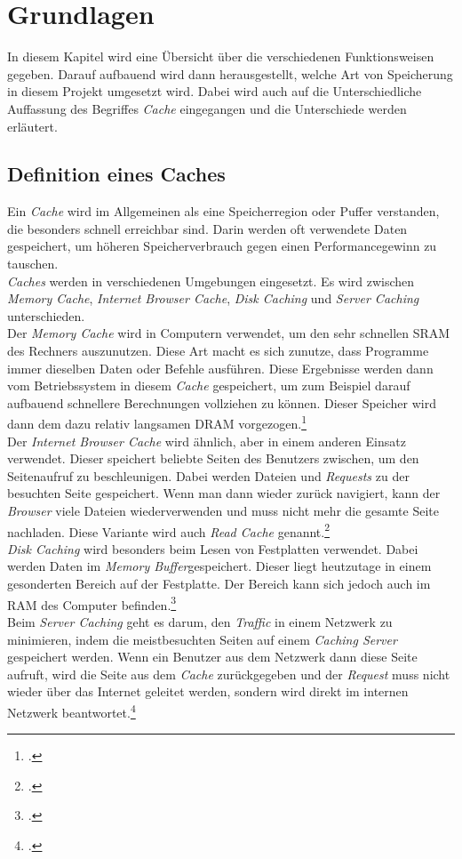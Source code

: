 \chapter{Grundlagen}
\label{cha:grundlagen}
In diesem Kapitel wird eine Übersicht über die verschiedenen Funktionsweisen gegeben. Darauf aufbauend wird dann herausgestellt, welche Art von Speicherung in diesem Projekt umgesetzt wird. Dabei wird auch auf die Unterschiedliche Auffassung des Begriffes \textit{Cache} eingegangen und die Unterschiede werden erläutert.

\section{Definition eines Caches}
\label{sec:cache-definition}
Ein \textit{Cache} wird im Allgemeinen als eine Speicherregion oder Puffer verstanden, die besonders schnell erreichbar sind. Darin werden oft verwendete Daten gespeichert, um höheren Speicherverbrauch gegen einen Performancegewinn zu tauschen.\\
\textit{Caches} werden in verschiedenen Umgebungen eingesetzt. Es wird zwischen \textit{Memory Cache}, \textit{Internet Browser Cache}, \textit{Disk Caching} und \textit{Server Caching} unterschieden.\\
Der \textit{Memory Cache} wird in Computern verwendet, um den sehr schnellen \ac{SRAM} des Rechners auszunutzen. Diese Art macht es sich zunutze, dass Programme immer dieselben Daten oder Befehle ausführen. Diese Ergebnisse werden dann vom Betriebssystem in diesem \textit{Cache} gespeichert, um zum Beispiel darauf aufbauend schnellere Berechnungen vollziehen zu können. Dieser Speicher wird dann dem dazu relativ langsamen \ac{DRAM} vorgezogen.\footcite[Vgl.][S.48f.]{Cache-GummerSommer}\\
Der \textit{Internet Browser Cache} wird ähnlich, aber in einem anderen Einsatz verwendet. Dieser speichert beliebte Seiten des Benutzers zwischen, um den Seitenaufruf zu beschleunigen. Dabei werden Dateien und \textit{Requests} zu der besuchten Seite gespeichert. Wenn man dann wieder zurück navigiert, kann der \textit{Browser} viele Dateien wiederverwenden und muss nicht mehr die gesamte Seite nachladen. Diese Variante wird auch \textit{Read Cache} genannt.\footcite{Cache-Techtarget}\\
\textit{Disk Caching} wird besonders beim Lesen von Festplatten verwendet. Dabei werden Daten im \textit{Memory Buffer}gespeichert. Dieser liegt heutzutage in einem gesonderten Bereich auf der Festplatte. Der Bereich kann sich jedoch auch im \ac{RAM} des Computer befinden.\footcite{Cache-Techtarget-DiskCache}\\
Beim \textit{Server Caching} geht es darum, den \textit{Traffic} in einem Netzwerk zu minimieren, indem die meistbesuchten Seiten auf einem \textit{Caching Server} gespeichert werden. Wenn ein Benutzer aus dem Netzwerk dann diese Seite aufruft, wird die Seite aus dem \textit{Cache} zurückgegeben und der \textit{Request} muss nicht wieder über das Internet geleitet werden, sondern wird direkt im internen Netzwerk beantwortet.\footcite{Cache-ProxyCache}\\

